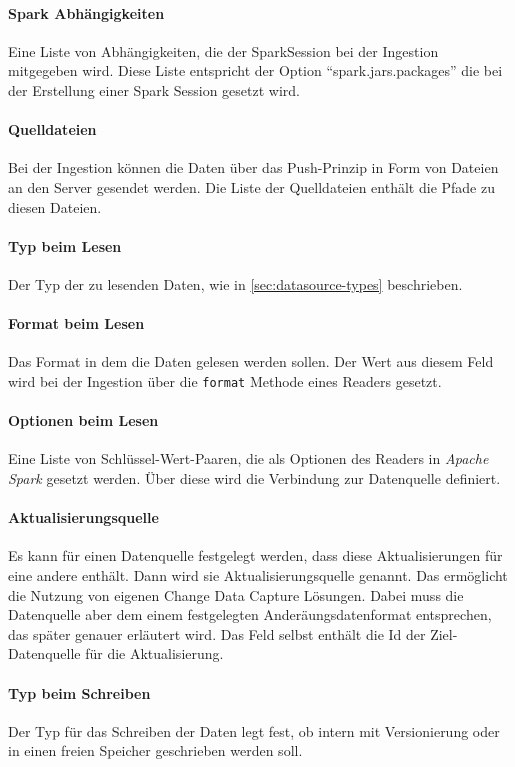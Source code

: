 \paragraph{Spark Abhängigkeiten} 
Eine Liste von Abhängigkeiten, die der SparkSession bei der Ingestion mitgegeben wird.
Diese Liste entspricht der Option "`spark.jars.packages"' die bei der Erstellung einer Spark Session gesetzt wird.

\paragraph{Quelldateien} 
Bei der Ingestion können die Daten über das Push-Prinzip in Form von Dateien an den Server gesendet werden.
Die Liste der Quelldateien enthält die Pfade zu diesen Dateien.

\paragraph{Typ beim Lesen} 
Der Typ der zu lesenden Daten, wie in \ref{sec:datasource-types} beschrieben.

\paragraph{Format beim Lesen} 
Das Format in dem die Daten gelesen werden sollen.
Der Wert aus diesem Feld wird bei der Ingestion über die \verb|format| Methode eines 
Readers gesetzt.

\paragraph{Optionen beim Lesen} 
Eine Liste von Schlüssel-Wert-Paaren, die als Optionen des Readers in \textit{Apache Spark} gesetzt werden.
Über diese wird die Verbindung zur Datenquelle definiert.

\paragraph{Aktualisierungsquelle} 
Es kann für einen Datenquelle festgelegt werden, dass diese Aktualisierungen für eine andere enthält.
Dann wird sie Aktualisierungsquelle genannt.
Das ermöglicht die Nutzung von eigenen Change Data Capture Lösungen.
Dabei muss die Datenquelle aber dem einem festgelegten Anderäungsdatenformat entsprechen, das später genauer erläutert wird.
Das Feld selbst enthält die Id der Ziel-Datenquelle für die Aktualisierung.

\paragraph{Typ beim Schreiben} 
Der Typ für das Schreiben der Daten legt fest, ob intern mit Versionierung oder in einen freien Speicher geschrieben werden soll.

